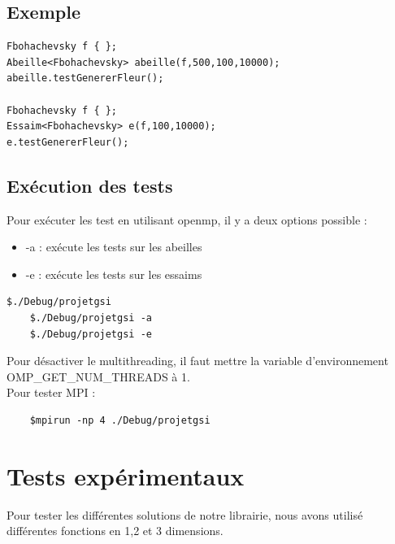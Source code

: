 \documentclass[12pt]{article}
\begin{document}
\subsection{Exemple}
\begin{lstlisting}
Fbohachevsky f { };
Abeille<Fbohachevsky> abeille(f,500,100,10000);
abeille.testGenererFleur();

Fbohachevsky f { };
Essaim<Fbohachevsky> e(f,100,10000);
e.testGenererFleur();
\end{lstlisting}

\subsection{Exécution des tests}
Pour exécuter les test en utilisant openmp, il y a deux options possible :
\begin{itemize}
\item -a : exécute les tests sur les abeilles
\item -e : exécute les tests sur les essaims
\end{itemize}
\begin{lstlisting}
$./Debug/projetgsi
    $./Debug/projetgsi -a
    $./Debug/projetgsi -e
\end{lstlisting}
Pour désactiver le multithreading, il faut mettre la variable d'environnement OMP\_GET\_NUM\_THREADS à 1.\\
Pour tester MPI :
\begin{lstlisting}
	$mpirun -np 4 ./Debug/projetgsi
\end{lstlisting}


\newpage
\section{Tests expérimentaux}
Pour tester les différentes solutions de notre librairie, nous avons utilisé différentes fonctions en 1,2 et 3 dimensions. 
\end{document}
